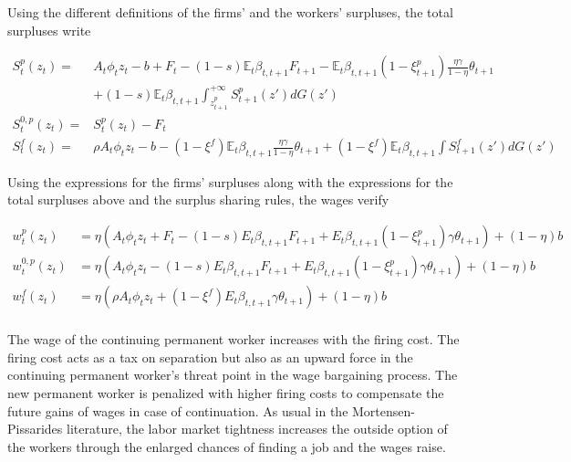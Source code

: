 \documentclass[a4paper]{article}
\begin{document}
Using the different definitions of the firms' and the workers' surpluses, the total surpluses write

\begin{align*}
S_t^p \left( z_t \right) = &A_t \phi_t z_t - b + F_t - (1-s) \mathbb{E}_t \beta_{t,t+1} F_{t+1} - \mathbb{E}_t \beta_{t,t+1} \left( 1 - \xi_{t+1}^p \right) \frac{\eta \gamma}{1-\eta}\theta_{t+1}\\
& + (1-s) \mathbb{E}_t \beta_{t,t+1} \int_{z_{t+1}^p}^{+\infty} S_{t+1}^p \left( z' \right) dG\left( z' \right)\\
S_t^{0,p} \left( z_t \right) =& S_t^{p} \left( z_t \right) - F_t\\
S_t^f \left( z_t \right) =& \rho A_t \phi_t z_t - b - \left( 1 - \xi^f \right) \mathbb{E}_t \beta_{t,t+1} \frac{\eta \gamma}{1-\eta}\theta_{t+1} + \left( 1 - \xi^f \right)\mathbb{E}_t \beta_{t,t+1} \int S_{t+1}^f \left( z' \right) dG \left( z' \right)
\end{align*}

Using the expressions for the firms' surpluses along with the expressions for the total surpluses above and the surplus sharing rules, the wages verify

\begin{align*}
w_t^p \left( z_t \right) &= \eta \left( A_t \phi_t z_t + F_t -(1-s)E_t \beta_{t,t+1}F_{t+1} + E_t \beta_{t,t+1} \left( 1-\xi_{t+1}^p \right) \gamma \theta_{t+1} \right) + (1-\eta) b\\
w_t^{0,p} \left( z_t \right) &= \eta \left( A_t \phi_t z_t -(1-s)E_t \beta_{t,t+1} F_{t+1} + E_t \beta_{t,t+1} \left( 1-\xi_{t+1}^p \right) \gamma \theta_{t+1} \right) + (1-\eta) b\\
w_t^f \left( z_t \right) &= \eta \left( \rho A_t \phi_t z_t + \left( 1-\xi^f \right) E_t \beta_{t,t+1} \gamma \theta_{t+1} \right) + (1-\eta) b\\
\end{align*}

The wage of the continuing permanent worker increases with the firing cost. The firing cost acts as a tax on separation but also as an upward force in the continuing permanent worker's threat point in the wage bargaining process. The new permanent worker is penalized with higher firing costs to compensate the future gains of wages in case of continuation. As usual in the Mortensen-Pissarides literature, the labor market tightness increases the outside option of the workers through the enlarged chances of finding a job and the wages raise.
\end{document}
